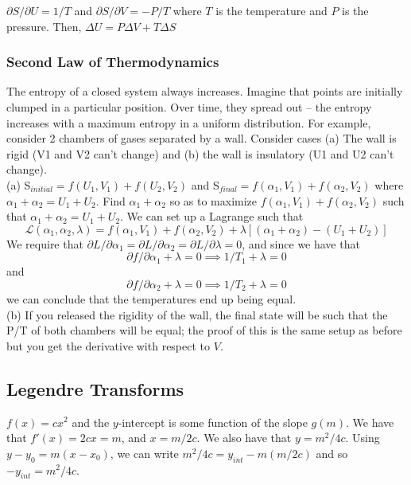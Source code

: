 \documentclass[11pt]{article}
\theoremstyle{definition}
\begin{document}
$\partial S/ \partial U = 1/T$ and $\partial S / \partial V = -P/T$ where $T$ is the temperature and $P$ is the pressure. Then, $\Delta U = P \Delta V + T \Delta S$

\subsubsection{Second Law of Thermodynamics}

The entropy of a closed system always increases. Imagine that points are initially clumped in a particular position. Over time, they spread out -- the entropy increases with a maximum entropy in a uniform distribution. For example, consider 2 chambers of gases separated by a wall. Consider cases (a) The wall is rigid (V1 and V2 can't change) and (b) the wall is insulatory (U1 and U2 can't change). \\

(a) S$_{initial} = f(U_1, V_1) + f(U_2, V_2)$ and S$_{final} = f(\alpha_1, V_1) + f(\alpha_2, V_2)$ where $\alpha_1 + \alpha_2 = U_1 + U_2$. Find $\alpha_1 + \alpha_2$ so as to maximize $f(\alpha_1, V_1) + f(\alpha_2, V_2)$ such that $\alpha_1 + \alpha_2 = U_1 + U_2$. We can set up a Lagrange such that $$\mathcal{L}(\alpha_1, \alpha_2, \lambda) = f(\alpha_1, V_1) + f(\alpha_2, V_2) + \lambda[(\alpha_1 + \alpha_2) - (U_1 + U_2)]$$We require that $\partial L / \partial \alpha_1 = \partial L / \partial \alpha_2 = \partial L / \partial \lambda = 0$, and since we have that $$\partial f / \partial \alpha_1 + \lambda = 0 \implies 1/T_1 + \lambda = 0$$ and $$\partial f / \partial \alpha_2 + \lambda = 0 \implies 1/T_2 + \lambda = 0$$we can conclude that the temperatures end up being equal. \\

(b) If you released the rigidity of the wall, the final state will be such that the P/T of both chambers will be equal; the proof of this is the same setup as before but you get the derivative with respect to $V$. 

\subsection{Legendre Transforms}

\example $f(x) = cx^2$ and the $y$-intercept is some function of the slope $g(m)$. We have that $f'(x) = 2cx = m$, and $x = m/2c$. We also have that $y = m^2/4c$. Using $y - y_0 = m(x-x_0)$, we can write $m^2/4c = y_{int} - m(m/2c)$ and so $-y_{int} = m^2/4c$. 
\end{document}
